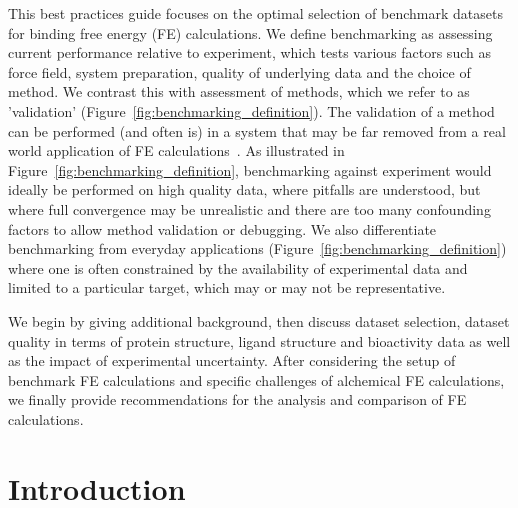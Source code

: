 \documentclass[9pt,bestpractices]{livecoms}
\begin{document}
This best practices guide focuses on the optimal selection of benchmark datasets for binding free energy (FE) calculations. We define benchmarking as assessing current performance relative to experiment, which tests various factors such as force field, system preparation, quality of underlying data and the choice of method. We contrast this with assessment of methods, which we refer to as 'validation' (Figure~\ref{fig:benchmarking_definition}). The validation of a method can be performed (and often is) in a system that may be far removed from a real world application of FE calculations~\cite{mobleyPredictingBindingFree2017}. 
As illustrated in Figure~\ref{fig:benchmarking_definition}, benchmarking against experiment would ideally be performed on high quality data, where pitfalls are understood, but where full convergence may be unrealistic and there are too many confounding factors to allow method validation or debugging. We also differentiate benchmarking from everyday applications (Figure~\ref{fig:benchmarking_definition}) where one is often constrained by the availability of experimental data and limited to a particular target, which may or may not be representative. 

We begin by giving additional background, then discuss dataset selection, dataset quality in terms of protein structure, ligand structure and bioactivity data as well as the impact of experimental uncertainty. 
After considering the setup of benchmark FE calculations and specific challenges of alchemical FE calculations, we finally provide recommendations for the analysis and comparison of FE calculations.

\section{Introduction}
\end{document}
